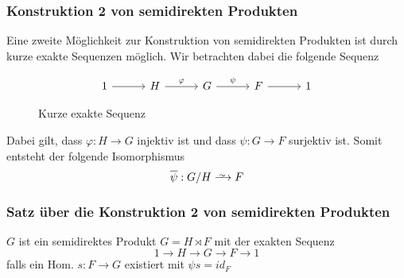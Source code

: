 \documentclass[12pt, german]{article}
\newcommand\iso{\xrightarrow{
		\,\smash{\raisebox{-0.65ex}{\ensuremath{\scriptstyle\sim}}}\,}}
\begin{document}
\subsubsection{Konstruktion 2 von semidirekten Produkten}
Eine zweite Möglichkeit zur Konstruktion von semidirekten Produkten ist durch kurze exakte Sequenzen möglich. 
Wir betrachten dabei die folgende Sequenz
\begin{figure}[h!]
	\centering
	\begin{equation*}
	\begin{tikzcd}[column sep=2.5pc]
	1 \arrow{r}{} & H \arrow{r}{\varphi} & G \arrow{r}{\psi} & F \arrow{r}{} & 1
	\end{tikzcd}
	\end{equation*}
	\caption{Kurze exakte Sequenz}
\end{figure} 

Dabei gilt, dass $\varphi : H \to G$ injektiv ist und dass $\psi : G \to F$ surjektiv ist. Somit entsteht der folgende Isomorphismus $$\overline{\psi} : G/H \iso F$$

\subsubsection{Satz über die Konstruktion 2 von semidirekten Produkten}
$G$ ist ein semidirektes Produkt $G = H\rtimes F$ mit der exakten Sequenz $$1 \to H \to G \to F \to 1$$ falls ein Hom. $s: F \to G$ existiert  mit $\psi s = id_F$
\end{document}
